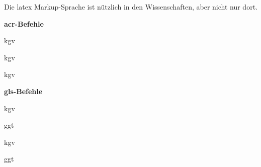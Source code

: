 \documentclass[12pt,ngerman]{scrartcl}
\begin{document}
Die \Gls{latex} Markup-Sprache ist nützlich in den Wissenschaften, aber nicht nur dort.

\textbf{acr-Befehle}

\acrlong{kgv}

\acrshort{kgv}

\acrfull{kgv}

\textbf{gls-Befehle}


\gls{kgv}

\gls{ggt}

\clearpage

\gls{kgv}

\gls{ggt}



\printglossary[type=\acronymtype]

\printglossary
\end{document}
